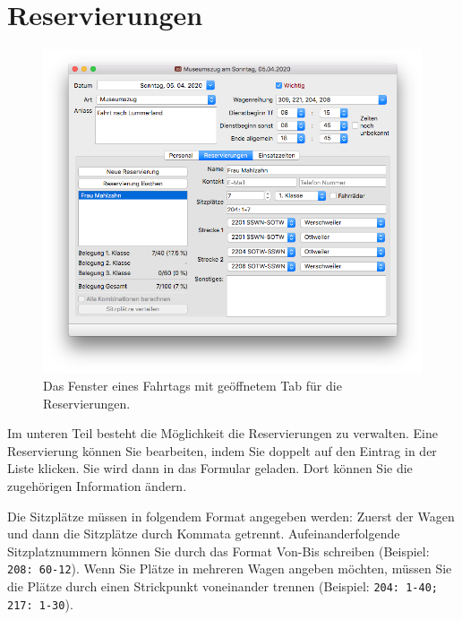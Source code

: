 \section{Reservierungen}
\begin{figure}[!h]
	\includegraphics[width=\textwidth]{img/fahrtag_reservierungen}
	\caption{Das Fenster eines Fahrtags mit geöffnetem Tab für die Reservierungen.}
	\label{fig:fahrtag:reservierungen}
\end{figure}
Im unteren Teil besteht die Möglichkeit die Reservierungen zu verwalten.
Eine Reservierung können Sie bearbeiten, indem Sie doppelt auf den Eintrag in der Liste klicken.
Sie wird dann in das Formular geladen. Dort können Sie die zugehörigen Information ändern.


Die Sitzplätze müssen in folgendem Format angegeben werden:
Zuerst der Wagen und dann die Sitzplätze durch Kommata getrennt.
Aufeinanderfolgende Sitzplatznummern können Sie durch das Format Von-Bis schreiben (Beispiel: \texttt{208: 60-12}).
Wenn Sie Plätze in mehreren Wagen angeben möchten,
müssen Sie die Plätze durch einen Strickpunkt voneinander trennen
(Beispiel: \texttt{204: 1-40; 217: 1-30}).


